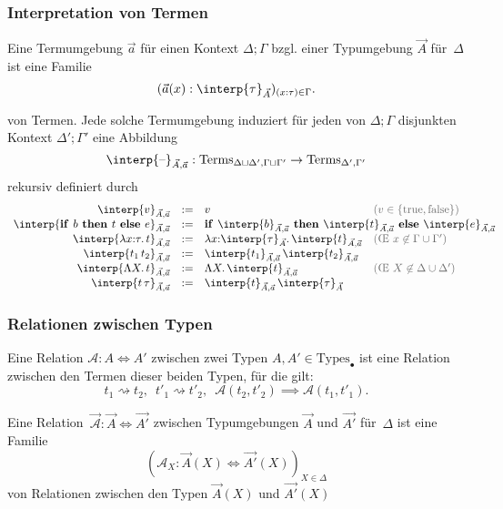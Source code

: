 \documentclass{beamer}
\newcommand{\defeq}{:=} %
\newcommand{\trueV}{\text{true}}
\newcommand{\falseV}{\text{false}}
\newcommand{\lam}[1]{\lambda #1.\,}
\newcommand{\Lam}[1]{\Lambda #1.\,}
\newcommand{\Types}{\text{Types}}
\newcommand{\Terms}{\text{Terms}}
\newcommand{\blank}{\text{--}} %
\newcommand{\reducesTo}{\mathbin{\rightsquigarrow}} %
\newcommand{\ite}[3]{\text{\textbf{if }} #1 \text{\textbf{ then }} #2 \text{\textbf{ else }} #3}
\newcommand{\typeInterp}[2]{\interp{#2}_{#1}}
\newcommand{\termInterp}[3]{\interp{#3}_{#1, #2}}
\newcommand{\Rel}[3]{#1 : #2 \Leftrightarrow #3}
\renewcommand{\emph}[1]{\textcolor{Emph}{#1}}
\newcommand{\info}[1]{\textcolor{dimgray}{#1}}
\begin{document}
\begin{frame}
  \frametitle{Interpretation von Termen}

  Eine \emph{Termumgebung} $\vec{a}$ für einen Kontext $\Delta; \Gamma$ bzgl. einer Typumgebung $\vec{A}$ für~$\Delta$ ist eine Familie
  \[ (\vec{a}(x) : \typeInterp{\vec{A}}{\tau})_{(x : \tau) \in \Gamma}. \]

  von Termen.
  Jede solche Termumgebung induziert für jeden von $\Delta;\Gamma$ disjunkten Kontext $\Delta';\Gamma'$ eine Abbildung
  \[ \termInterp{\vec{A}}{\vec{a}}{\blank} : \Terms_{\Delta \sqcup \Delta', \Gamma \sqcup \Gamma'} \to \Terms_{\Delta', \Gamma'} \]
  rekursiv definiert durch
  \[
    \begin{array}{r c l l}
      \termInterp{\vec{A}}{\vec{a}}{v} &\defeq& v & \info{(v \in \{ \trueV, \falseV \})} \\
      \termInterp{\vec{A}}{\vec{a}}{\ite{b}{t}{e}} &\defeq& \mathrlap{\ite{\termInterp{\vec{A}}{\vec{a}}{b}}{\termInterp{\vec{A}}{\vec{a}}{t}}{\termInterp{\vec{A}}{\vec{a}}{e}}} \\
      \termInterp{\vec{A}}{\vec{a}}{\lam{x{:}\tau} t} &\defeq& \lam{x{:}\typeInterp{\vec{A}}{\tau}} \termInterp{\vec{A}}{\vec{a}}{t} & \text{\info{(\OE{} $x \not\in \Gamma \cup \Gamma'$)}} \\
      \termInterp{\vec{A}}{\vec{a}}{t_1 \, t_2} &\defeq& \termInterp{\vec{A}}{\vec{a}}{t_1} \, \termInterp{\vec{A}}{\vec{a}}{t_2} \\
      \termInterp{\vec{A}}{\vec{a}}{\Lam{X} t} &\defeq& \Lam{X} \termInterp{\vec{A}}{\vec{a}}{t} & \text{\info{(\OE{} $X \not\in \Delta \cup \Delta'$)}} \\
      \termInterp{\vec{A}}{\vec{a}}{t\,\tau} &\defeq& \termInterp{\vec{A}}{\vec{a}}{t}\,\typeInterp{\vec{A}}{\tau} \\
    \end{array}
  \]
\end{frame}

\begin{frame}
  \frametitle{Relationen zwischen Typen}

  Eine \emph{Relation} $\Rel{\mathcal{A}}{A}{A'}$ zwischen zwei Typen $A, A' \in \Types_\bullet$ ist eine Relation zwischen den Termen dieser beiden Typen, für die gilt:
  \[
    t_1 \reducesTo{} t_2, \enspace
    t'_1 \reducesTo{} t'_2, \enspace
    \mathcal{A}(t_2, t'_2) \implies
    \mathcal{A}(t_1, t'_1).
  \]

  Eine \emph{Relation}~$\Rel{\vec{\mathcal{A}}}{\vec{A}}{\vec{A'}}$ zwischen Typumgebungen $\vec{A}$ und $\vec{A'}$ für~$\Delta$ ist eine Familie
  \[ (\Rel{\mathcal{A}_X}{\vec{A}(X)}{\vec{A'}(X)})_{X \in \Delta} \]
  von Relationen zwischen den Typen $\vec{A}(X)$ und $\vec{A'}(X)$
\end{frame}
\end{document}
